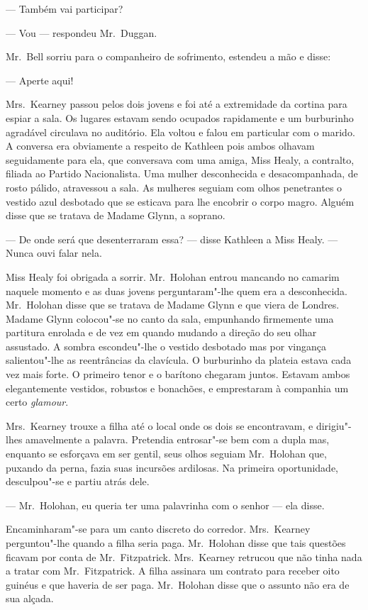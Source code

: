 --- Também vai participar?

--- Vou --- respondeu Mr.~Duggan.

Mr.~Bell sorriu para o companheiro de sofrimento, estendeu a mão e disse:

--- Aperte aqui!

Mrs.~Kearney passou pelos dois jovens e foi até a extremidade da cortina para
espiar a sala.  Os lugares estavam sendo ocupados rapidamente e um burburinho
agradável circulava no auditório.  Ela voltou e falou em particular com o
marido.  A conversa era obviamente a respeito de Kathleen pois ambos olhavam
seguidamente para ela, que conversava com uma amiga, Miss Healy, a contralto,
filiada ao Partido Nacionalista.  Uma mulher desconhecida e desacompanhada, de
rosto pálido, atravessou a sala.  As mulheres seguiam com olhos penetrantes o
vestido azul desbotado que se esticava para lhe encobrir o corpo magro.  Alguém
disse que se tratava de Madame Glynn, a soprano.

--- De onde será que desenterraram essa? --- disse Kathleen a Miss Healy.  ---
Nunca ouvi falar nela.

Miss Healy foi obrigada a sorrir.  Mr.~Holohan entrou mancando no camarim
naquele momento e as duas jovens perguntaram"-lhe quem era a desconhecida.  
Mr.~Holohan disse que se tratava de Madame Glynn e que viera de Londres.  Madame
Glynn colocou"-se no canto da sala, empunhando firmemente uma partitura enrolada
e de vez em quando mudando a direção do seu olhar assustado.  A sombra
escondeu"-lhe o vestido desbotado mas por vingança salientou"-lhe as reentrâncias
da clavícula.  O burburinho da plateia estava cada vez mais forte.  O primeiro
tenor e o barítono chegaram juntos.  Estavam ambos elegantemente vestidos,
robustos e bonachões, e emprestaram à companhia um certo \textit{glamour}.

Mrs.~Kearney trouxe a filha até o local onde os dois se encontravam, e
dirigiu"-lhes amavelmente a palavra.  Pretendia entrosar"-se bem com a dupla mas,
enquanto se esforçava em ser gentil, seus olhos seguiam Mr.~Holohan que,
puxando da perna, fazia suas incursões ardilosas.  Na primeira oportunidade,
desculpou"-se e partiu atrás dele.

--- Mr.~Holohan, eu queria ter uma palavrinha com o senhor --- ela disse.

Encaminharam"-se para um canto discreto do corredor.  Mrs.~Kearney perguntou"-lhe
quando a filha seria paga.  Mr.~Holohan disse que tais questões ficavam por
conta de Mr.~Fitzpatrick.  Mrs.~Kearney retrucou que não tinha nada a tratar
com Mr.~Fitzpatrick.  A filha assinara um contrato para receber oito guinéus e
que haveria de ser paga.  Mr.~Holohan disse que o assunto não era de sua
alçada.

